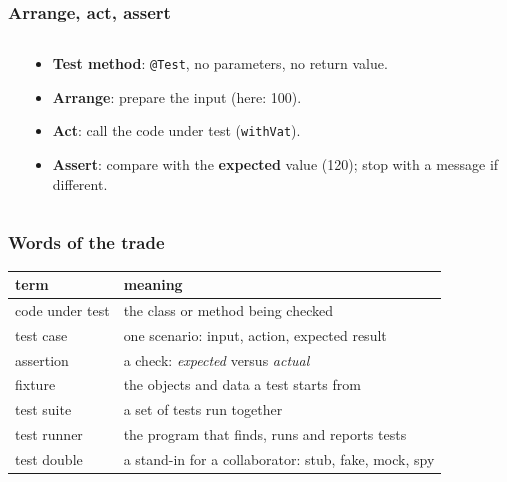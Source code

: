 \documentclass[aspectratio=169,10pt,compress]{beamer}
\begin{document}
\begin{frame}[t,fragile] \frametitle{Arrange, act, assert}
  \begin{columns}[T]
    \begin{column}{0.5\textwidth}
    \end{column}
    \begin{column}{0.46\textwidth}
      \begin{itemize}\small
        \item \textbf{Test method}: \texttt{@Test}, no parameters, no return value.
        \item \textbf{Arrange}: prepare the input (here: 100).
        \item \textbf{Act}: call the code under test (\texttt{withVat}).
        \item \textbf{Assert}: compare with the \textbf{expected} value (120); stop with a message if different.
      \end{itemize}
    \end{column}
  \end{columns}
\end{frame}




\begin{frame}[t,fragile] \frametitle{Words of the trade}
  \begin{center}\small
  \begin{tabular}{lL{0.66\textwidth}}
    \toprule
    \textbf{term}       & \textbf{meaning} \\
    \midrule
    code under test     & the class or method being checked \\
    test case           & one scenario: input, action, expected result \\
    assertion           & a check: \emph{expected} versus \emph{actual} \\
    fixture             & the objects and data a test starts from \\
    test suite          & a set of tests run together \\
    test runner         & the program that finds, runs and reports tests \\
    test double         & a stand-in for a collaborator: stub, fake, mock, spy \\
    \bottomrule
  \end{tabular}
  \end{center}
\end{frame}
\end{document}

